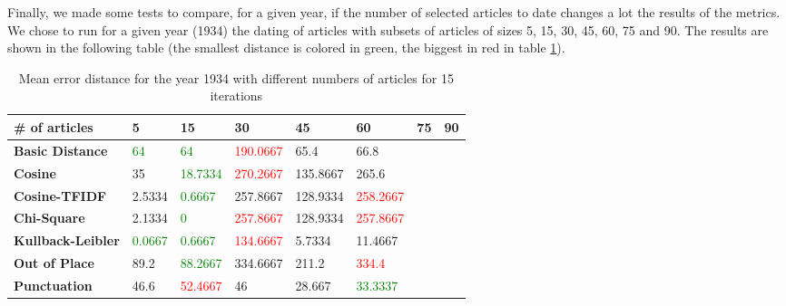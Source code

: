Finally, we made some tests to compare, for a given year, if the number of selected articles to date changes a lot the results of the metrics. We chose to run for a given year (1934) the dating of articles with subsets of articles of sizes 5, 15, 30, 45, 60, 75 and 90. The results are shown in the following table (the smallest distance is colored in green, the biggest in red in table \ref{table_comparison_size_articles}).
\begin{center}
    \begin{table}[h!]
        \begin{tabular}{ | p{3.3cm} | p{1.4cm} | p{1.4cm} | p{1.4cm} | p{1.4cm} | p{1.4cm} | p{1.4cm} | p{1.4cm} | }
            \hline
            \textbf{\# of articles} & \textbf{5} & \textbf{15} & \textbf{30} & \textbf{45} & \textbf{60} & \textbf{75} & \textbf{90}\\
            \hline
            \hline
            \textbf{Basic Distance} & \textcolor{green}{64} & \textcolor{green}{64} & \textcolor{red}{190.0667} & 65.4 & 66.8 & & \\
            \hline
            \textbf{Cosine} & 35 & \textcolor{green}{18.7334} & \textcolor{red}{270.2667} & 135.8667 & 265.6 & & \\
            \hline
            \textbf{Cosine-TFIDF} & 2.5334 & \textcolor{green}{0.6667} & 257.8667 & 128.9334 & \textcolor{red}{258.2667} & &  \\
            \hline
            \textbf{Chi-Square} & 2.1334 & \textcolor{green}{0} & \textcolor{red}{257.8667} & 128.9334 & \textcolor{red}{257.8667} & & \\
            \hline
            \textbf{Kullback-Leibler} & \textcolor{green}{0.0667} & \textcolor{green}{0.6667} & \textcolor{red}{134.6667} & 5.7334 & 11.4667 & & \\
            \hline
            \textbf{Out of Place} & 89.2 & \textcolor{green}{88.2667} & 334.6667 & 211.2 & \textcolor{red}{334.4} & & \\
            \hline
            \textbf{Punctuation} & 46.6 & \textcolor{red}{52.4667} & 46 & 28.667 & \textcolor{green}{33.3337} & & \\
            \hline
        \end{tabular}
        \caption{Mean error distance for the year 1934 with different numbers of articles for 15 iterations}
        \label{table_comparison_size_articles}
    \end{table}
\end{center}


